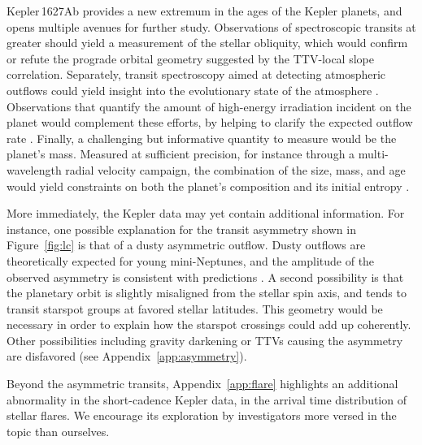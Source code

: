 \documentclass[12pt,modern,twocolumn,tighten,linenumbers]{aastex63}
\begin{document}
Kepler\,1627Ab provides a new extremum in the ages of the Kepler
planets, and opens multiple avenues for further study.  Observations
of spectroscopic transits at greater
 should yield a
measurement of the stellar obliquity, which would confirm or refute
the prograde orbital geometry suggested by the TTV-local slope
correlation.  Separately, transit spectroscopy aimed at detecting
atmospheric outflows could yield insight into the evolutionary state
of the atmosphere \citep[{\it
e.g.},][]{ehrenreich_giant_2015,spake_helium_2018,vissapragada_2020}.
Observations that quantify the amount of high-energy
irradiation incident on the planet would complement these efforts, by
helping to clarify the expected outflow rate \citep[{\it
e.g.},][]{poppenhaeger_2021}.  Finally, a challenging but informative
quantity to measure would be the planet's mass.  Measured at
sufficient precision,
for instance through a multi-wavelength radial velocity campaign,
the combination of the size, mass, and age 
would yield constraints on both the planet's composition and its
initial entropy \citep{owen_constraining_2020}.

More immediately, the Kepler data may yet contain additional
information.  For instance, one possible explanation for the transit
asymmetry shown in Figure~\ref{fig:lc} is that of a dusty asymmetric
outflow.  
Dusty outflows are theoretically
expected for young mini-Neptunes, and the amplitude of the observed
asymmetry is consistent with predictions \citep{wang_dai_2019}.
A second possibility is that the planetary orbit is slightly
misaligned from the stellar spin axis, and tends to transit starspot
groups at favored stellar latitudes.  
This geometry would be necessary in order to
explain how the starspot crossings could add up coherently.
Other possibilities including
gravity darkening or TTVs causing the asymmetry are disfavored (see
Appendix~\ref{app:asymmetry}).  

Beyond the asymmetric transits, Appendix~\ref{app:flare}
highlights an additional abnormality in the short-cadence Kepler data, in the
arrival time distribution of stellar flares.  We encourage its
exploration by investigators more versed in the topic than ourselves.
\end{document}
